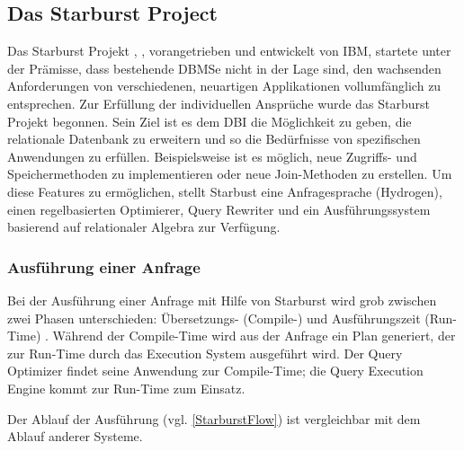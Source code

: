 \subsection{Das Starburst Project}

Das Starburst Projekt \cite{lohman1988Starbust}, \cite{haas1989extensible}, vorangetrieben und entwickelt von IBM,  startete unter der Prämisse, dass bestehende DBMSe nicht in der Lage sind, den wachsenden Anforderungen von verschiedenen, neuartigen Applikationen vollumfänglich zu entsprechen. Zur Erfüllung der individuellen Ansprüche wurde das Starburst Projekt begonnen. Sein Ziel ist es dem \ac{DBI} die Möglichkeit zu geben, die relationale Datenbank zu erweitern und so die Bedürfnisse von spezifischen Anwendungen zu erfüllen. Beispielsweise ist es möglich, neue Zugriffs- und Speichermethoden zu implementieren oder neue Join-Methoden zu erstellen. Um diese Features zu ermöglichen, stellt Starbust eine Anfragesprache (Hydrogen), einen regelbasierten Optimierer, Query Rewriter und ein Ausführungssystem basierend auf relationaler Algebra zur Verfügung.


\subsubsection{Ausführung einer Anfrage}

Bei der Ausführung einer Anfrage mit Hilfe von Starburst wird grob zwischen zwei Phasen unterschieden: Übersetzungs- (Compile-) und Ausführungszeit (Run-Time) \cite{haas1989extensible}. Während der Compile-Time wird aus der Anfrage ein Plan generiert, der zur Run-Time durch das Execution System ausgeführt wird. Der Query Optimizer findet seine Anwendung zur Compile-Time; die Query Execution Engine kommt zur Run-Time zum Einsatz.

Der Ablauf der Ausführung (vgl. \ref{StarburstFlow}) ist vergleichbar mit dem Ablauf anderer Systeme.

